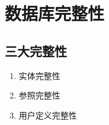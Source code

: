 \section{数据库完整性}
\subsection{三大完整性}
\begin{enumerate}
\item 实体完整性
\item 参照完整性
\item 用户定义完整性
\end{enumerate}